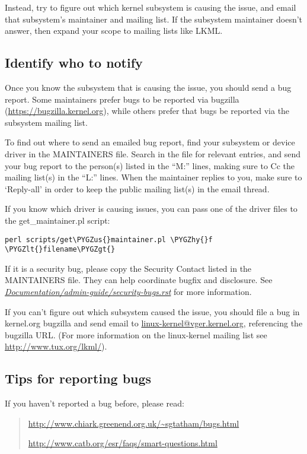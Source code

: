 \documentclass[a4paper,8pt,english]{sphinxmanual}
\def\PYGZus{\char`\_}
\def\PYGZlt{\char`\<}
\def\PYGZgt{\char`\>}
\def\PYGZhy{\char`\-}
\begin{document}
Instead, try to figure out which kernel subsystem is causing the issue,
and email that subsystem's maintainer and mailing list.  If the subsystem
maintainer doesn't answer, then expand your scope to mailing lists like
LKML.


\subsection{Identify who to notify}
\label{admin-guide/reporting-bugs:identify-who-to-notify}
Once you know the subsystem that is causing the issue, you should send a
bug report.  Some maintainers prefer bugs to be reported via bugzilla
(\href{https://bugzilla.kernel.org}{https://bugzilla.kernel.org}), while others prefer that bugs be reported
via the subsystem mailing list.

To find out where to send an emailed bug report, find your subsystem or
device driver in the MAINTAINERS file.  Search in the file for relevant
entries, and send your bug report to the person(s) listed in the ``M:''
lines, making sure to Cc the mailing list(s) in the ``L:'' lines.  When the
maintainer replies to you, make sure to `Reply-all' in order to keep the
public mailing list(s) in the email thread.

If you know which driver is causing issues, you can pass one of the driver
files to the get\_maintainer.pl script:

\begin{Verbatim}[commandchars=\\\{\}]
perl scripts/get\PYGZus{}maintainer.pl \PYGZhy{}f \PYGZlt{}filename\PYGZgt{}
\end{Verbatim}

If it is a security bug, please copy the Security Contact listed in the
MAINTAINERS file.  They can help coordinate bugfix and disclosure.  See
{\hyperref[admin\string-guide/security\string-bugs:securitybugs]{\emph{Documentation/admin-guide/security-bugs.rst}}} for more information.

If you can't figure out which subsystem caused the issue, you should file
a bug in kernel.org bugzilla and send email to
\href{mailto:linux-kernel@vger.kernel.org}{linux-kernel@vger.kernel.org}, referencing the bugzilla URL.  (For more
information on the linux-kernel mailing list see
\href{http://www.tux.org/lkml/}{http://www.tux.org/lkml/}).


\subsection{Tips for reporting bugs}
\label{admin-guide/reporting-bugs:tips-for-reporting-bugs}
If you haven't reported a bug before, please read:
\begin{quote}

\href{http://www.chiark.greenend.org.uk/~sgtatham/bugs.html}{http://www.chiark.greenend.org.uk/\textasciitilde{}sgtatham/bugs.html}

\href{http://www.catb.org/esr/faqs/smart-questions.html}{http://www.catb.org/esr/faqs/smart-questions.html}
\end{quote}
\end{document}
